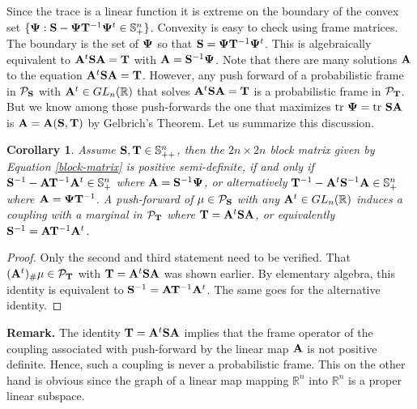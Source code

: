 \documentclass{amsart}
\numberwithin{equation}{section}
\newcommand\cP{{\mathcal P}}
\newcommand\bA{{\bf A}}
\newcommand\bS{{\bf S}}
\newcommand\bT{{\bf T}}
\newcommand\R{{\mathbb R}}
\newcommand\tr{{\operatorname{tr}}}
\theoremstyle{plain}
\newtheorem{corollary}[subsection]{Corollary}
\theoremstyle{definition}
\begin{document}
Since the trace is a linear function it is extreme on the boundary of the convex set $\{{\bf \Psi}: \bS- {\bf \Psi} \bT^{-1} {\bf \Psi}^t \in \mathbb{S}^n_{+}\}$. Convexity is easy to check using frame matrices. The boundary is the set of ${\bf \Psi}$ so that $\bS={\bf \Psi} \bT^{-1} {\bf \Psi}^t$. This is algebraically equivalent to $\bA^t\bS\bA=\bT$ with $\bA=\bS^{-1}{\bf \Psi}$. Note that there are many solutions $\bA$ to the equation $\bA^t\bS\bA=\bT$. However, any push forward of a probabilistic frame in $\cP_{\bS}$ with $\bA^t \in {\rm GL}_n(\R)$ that solves $\bA^t\bS\bA=\bT$ is a probabilistic frame in $\cP_{\bT}$. But we know among those push-forwards the one that maximizes $\tr\ {\bf \Psi}=\tr\ \bS \bA$ is $\bA=\bA(\bS,\bT)$ by Gelbrich's Theorem. Let us summarize this discussion. 
\begin{corollary}\label{olkin_pukelsheim_semd_condition}
Assume $\bS, \bT \in \mathbb{S}^n_{++}$, then the $2n \times 2n$ block matrix given by Equation \ref{block-matrix} is positive semi-definite, 
if and only if $\bS^{-1}- \bA \bT^{-1} \bA^t \in \mathbb{S}^n_{+}$ where $\bA = \bS^{-1}{\bf \Psi}$, or alternatively 
$\bT^{-1}- \bA^t \bS^{-1} \bA \in \mathbb{S}^n_{+}$ where $\bA = {\bf \Psi}\bT^{-1}$. 
A push-forward of $\mu \in \cP_{\bS}$ with any $\bA^t \in {\rm GL}_n(\R)$ induces a coupling with a marginal in $\cP_{\bT}$ where $\bT= \bA^t \bS \bA$, 
or equivalently $\bS^{-1}= \bA \bT^{-1} \bA^t$. 
\end{corollary}
\begin{proof}
Only the second and third statement need to be verified. That $(\bA^t)_{\#}\mu \in \cP_{\bT}$ with $\bT= \bA^t \bS \bA$ was shown earlier. 
By elementary algebra, this identity is equivalent to $\bS^{-1}= \bA \bT^{-1} \bA^t$. The same goes for the alternative identity.  
\end{proof}
{\bf Remark.} The identity $\bT= \bA^t \bS \bA$ implies that the frame operator of the coupling associated with push-forward by the linear map $\bA$ is not positive definite. Hence, such a coupling is never a probabilistic frame. This on the other hand is obvious since the graph of a linear map 
mapping $\R^n$ into $\R^n$ is a proper linear subspace. \\
\end{document}
